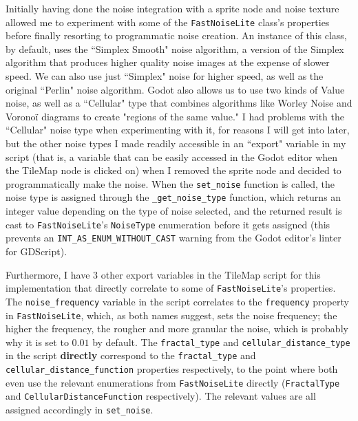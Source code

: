 Initially having done the noise integration with a sprite node and noise texture allowed me to experiment with some of the \verb|FastNoiseLite| class's properties before finally resorting to programmatic noise creation. An instance of this class, by default, uses the ``Simplex Smooth" noise algorithm, a version of the Simplex algorithm that produces higher quality noise images at the expense of slower speed.\cite{fastnoiselitedocs} We can also use just ``Simplex" noise for higher speed, as well as the original ``Perlin" noise algorithm.\cite{fastnoiselitedocs} Godot also allows us to use two kinds of Value noise, as well as a ``Cellular" type that combines algorithms like Worley Noise and Voronoï diagrams to create "regions of the same value."\cite{fastnoiselitedocs} I had problems with the ``Cellular" noise type when experimenting with it, for reasons I will get into later, but the other noise types I made readily accessible in an ``export" variable in my script (that is, a variable that can be easily accessed in the Godot editor when the TileMap node is clicked on) when I removed the sprite node and decided to programmatically make the noise. When the \verb|set_noise| function is called, the noise type is assigned through the \verb|_get_noise_type| function, which returns an integer value depending on the type of noise selected, and the returned result is cast to \verb|FastNoiseLite|'s \verb|NoiseType| enumeration\cite{fastnoiselitedocs} before it gets assigned (this prevents an \verb|INT_AS_ENUM_WITHOUT_CAST| warning from the Godot editor's linter for GDScript\cite{projectsettingsdocs}).

Furthermore, I have 3 other export variables in the TileMap script for this implementation that directly correlate to some of \verb|FastNoiseLite|'s properties. The \verb|noise_frequency| variable in the script correlates to the \verb|frequency| property in \verb|FastNoiseLite|, which, as both names suggest, sets the noise frequency; the higher the frequency, the rougher and more granular the noise\cite{fastnoiselitedocs}, which is probably why it is set to $0.01$ by default.\cite{fastnoiselitedocs}  The \verb|fractal_type| and \verb|cellular_distance_type| in the script \textbf{directly} correspond to the \verb|fractal_type| and \verb|cellular_distance_function| properties respectively, to the point where both even use the relevant enumerations from \verb|FastNoiseLite| directly (\verb|FractalType| and \verb|CellularDistanceFunction| respectively).\cite{fastnoiselitedocs} The relevant values are all assigned accordingly in \verb|set_noise|.

